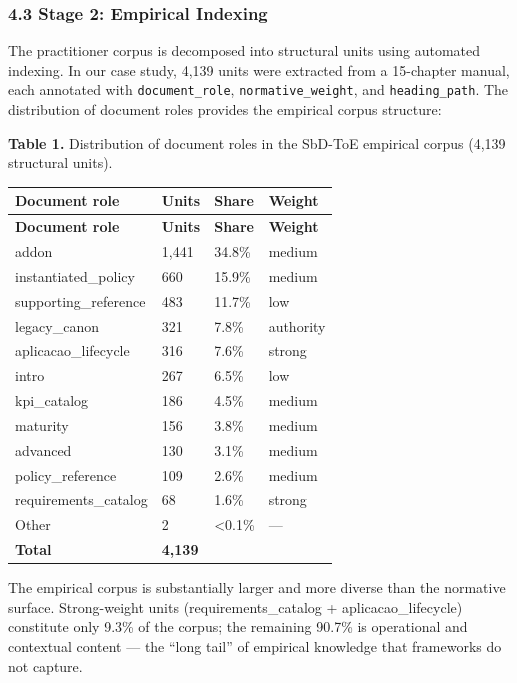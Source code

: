 \documentclass[
]{article}
\begin{document}
\subsubsection{4.3 Stage 2: Empirical
Indexing}\label{stage-2-empirical-indexing}

The practitioner corpus is decomposed into structural units using
automated indexing. In our case study, 4,139 units were extracted from a
15-chapter manual, each annotated with \texttt{document\_role},
\texttt{normative\_weight}, and \texttt{heading\_path}. The distribution
of document roles provides the empirical corpus structure:

\textbf{Table 1.} Distribution of document roles in the SbD-ToE
empirical corpus (4,139 structural units).

\begin{longtable}{@{}L{4.2cm}R{1.6cm}R{1.8cm}L{2cm}@{}}
\toprule
\textbf{Document role} & \textbf{Units} & \textbf{Share} & \textbf{Weight} \\
\midrule
\endfirsthead
\toprule
\textbf{Document role} & \textbf{Units} & \textbf{Share} & \textbf{Weight} \\
\midrule
\endhead
\bottomrule
\endfoot
\bottomrule
\endlastfoot
addon & 1,441 & 34.8\% & medium \\
instantiated\_policy & 660 & 15.9\% & medium \\
supporting\_reference & 483 & 11.7\% & low \\
legacy\_canon & 321 & 7.8\% & authority \\
aplicacao\_lifecycle & 316 & 7.6\% & strong \\
intro & 267 & 6.5\% & low \\
kpi\_catalog & 186 & 4.5\% & medium \\
maturity & 156 & 3.8\% & medium \\
advanced & 130 & 3.1\% & medium \\
policy\_reference & 109 & 2.6\% & medium \\
requirements\_catalog & 68 & 1.6\% & strong \\
Other & 2 & <0.1\% & --- \\
\textbf{Total} & \textbf{4,139} &  &  \\
\end{longtable}

The empirical corpus is substantially larger and more diverse than the
normative surface. Strong-weight units (requirements\_catalog +
aplicacao\_lifecycle) constitute only 9.3\% of the corpus; the remaining
90.7\% is operational and contextual content --- the ``long tail'' of
empirical knowledge that frameworks do not capture.
\end{document}
